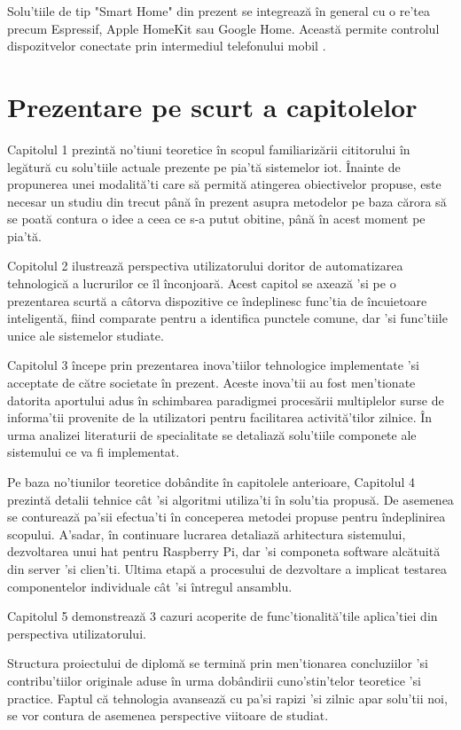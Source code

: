 Solu'tiile de tip "Smart Home" din prezent se integrează în general cu o re'tea precum Espressif, Apple HomeKit sau Google Home. Această permite controlul dispozitvelor conectate prin intermediul telefonului mobil \cite{RISTESKASTOJKOSKA20171454}.


\section {Prezentare pe scurt a capitolelor}

Capitolul 1 prezintă no'tiuni teoretice în scopul familiarizării cititorului în legătură cu solu'tiile actuale prezente pe pia'tă sistemelor \acrshort{iot}. Înainte de propunerea unei modalită'ti care să permită atingerea obiectivelor propuse, este necesar un studiu din trecut până în prezent asupra metodelor pe baza cărora să se poată contura o idee a ceea ce s-a putut obitine, până în acest moment pe pia'tă.

Copitolul 2 ilustrează perspectiva utilizatorului doritor de automatizarea tehnologică a lucrurilor ce îl înconjoară. Acest capitol se axează 'si pe o prezentarea scurtă a câtorva dispozitive ce îndeplinesc func'tia de încuietoare inteligentă, fiind comparate pentru a identifica punctele comune, dar 'si func'tiile unice ale sistemelor studiate.

Capitolul 3 începe prin prezentarea inova'tiilor tehnologice implementate 'si acceptate de către societate în prezent. Aceste inova'tii au fost men'tionate datorita aportului adus în schimbarea paradigmei procesării multiplelor surse de informa'tii provenite de la utilizatori pentru facilitarea activită'tilor zilnice. În urma analizei literaturii de specialitate se detaliază solu'tiile componete ale sistemului ce va fi implementat.

Pe baza no'tiunilor teoretice dobândite în capitolele anterioare, Capitolul 4 prezintă detalii tehnice cât 'si algoritmi utiliza'ti în solu'tia propusă. De asemenea se conturează pa'sii efectua'ti în conceperea metodei propuse pentru îndeplinirea scopului. A'sadar, în continuare lucrarea detaliază arhitectura sistemului, dezvoltarea unui \acrshort{hat} pentru Raspberry Pi, dar 'si componeta software alcătuită din server 'si clien'ti. Ultima etapă a procesului de dezvoltare a implicat testarea componentelor individuale cât 'si întregul ansamblu.

Capitolul 5 demonstrează 3 cazuri acoperite de func'tionalită'tile aplica'tiei din perspectiva utilizatorului.

Structura proiectului de diplomă se termină prin men'tionarea concluziilor 'si contribu'tiilor originale aduse în urma dobândirii cuno'stin'telor teoretice 'si practice. Faptul că tehnologia avansează cu pa'si rapizi 'si zilnic apar solu'tii noi, se vor contura de asemenea perspective viitoare de studiat.
